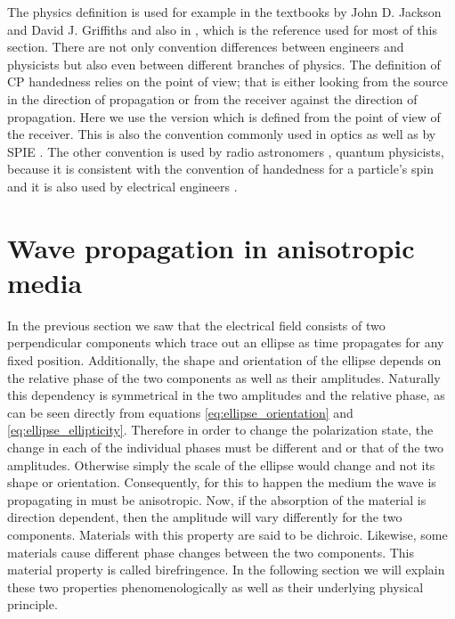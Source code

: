 The physics definition is used for example in the textbooks by John D. Jackson \cite{Jackson1998ClassicalEdition} and David J. Griffiths \cite{Griffiths2017IntroductionElectrodynamics} and also in \cite{Collett2009FieldPolarization}, which is the reference used for most of this section.
There are not only convention differences between engineers and physicists but also even between different branches of physics. The definition of CP handedness relies on the point of view; that is either looking from the source in the direction of propagation or from the receiver against the direction of propagation. Here we use the version which is defined from the point of view of the receiver. This is also the convention commonly used in optics \cite{Bass1995HandbookOptics, M.LandiDeglInnocenti2004PolarizationLines} as well as by SPIE \cite{Collett2009FieldPolarization}.
The other convention is used by radio astronomers \cite{1973CommissionAstronomie}, quantum physicists, because it is consistent with the convention of handedness for a particle's spin and it is also used by electrical engineers \cite{Orfanidis2004ElectromagneticAntennas}.

\section{Wave propagation in anisotropic media}
In the previous section we saw that the electrical field consists of two perpendicular components which trace out an ellipse as time propagates for any fixed position. Additionally, the shape and orientation of the ellipse depends on the relative phase of the two components as well as their amplitudes. Naturally this dependency is symmetrical in the two amplitudes and the relative phase, as can be seen directly from equations \ref{eq:ellipse_orientation} and \ref{eq:ellipse_ellipticity}. Therefore in order to change the polarization state, the change in each of the individual phases must be different and or that of the two amplitudes. Otherwise simply the scale of the ellipse would change and not its shape or orientation. Consequently, for this to happen the medium the wave is propagating in must be anisotropic. Now, if the absorption of the material is direction dependent, then the amplitude will vary differently for the two components. Materials with this property are said to be dichroic. Likewise, some materials cause different phase changes between the two components. This material property is called birefringence. In the following section we will explain these two properties phenomenologically as well as their underlying physical principle.

